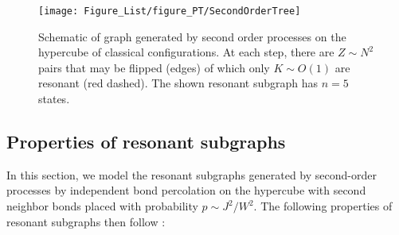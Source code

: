 \documentclass[aps,pra,twocolumn,a4paper,showpacs,superscriptaddress,floatfix,10pt]{revtex4}
\begin{document}
\begin{figure}[htb]
	\centering
	\texttt{[image: Figure\_List/figure\_PT/SecondOrderTree]}
	\caption{Schematic of graph generated by second order processes on the hypercube of classical configurations.
	At each step, there are $Z \sim N^2$ pairs that may be flipped (edges) of which only $K \sim O(1)$ are resonant (red dashed).
	The shown resonant subgraph has $n=5$ states.
	}
	\label{fig:secondordertree}
\end{figure}


\subsection{Properties of resonant subgraphs}
\label{sub:pt_props_resonant_subgraphs}

In this section, we model the resonant subgraphs generated by second-order processes by independent bond percolation on the hypercube with second neighbor bonds placed with probability $p \sim J^2/W^2$. The following properties of resonant subgraphs then follow \cite{Borgs:2001fw,Heydenreich:2015aa}:
\end{document}
